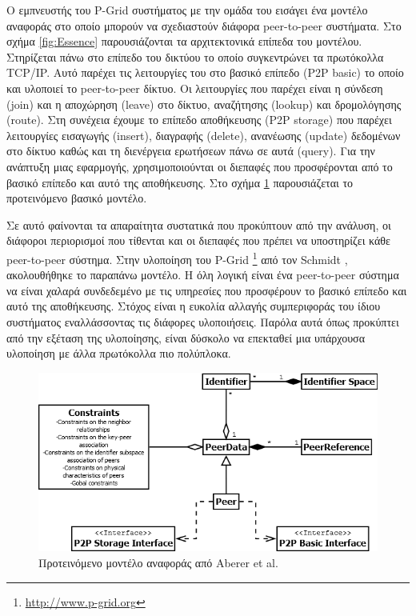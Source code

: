 Ο εμπνευστής του P-Grid συστήματος με την ομάδα του εισάγει ένα 
μοντέλο αναφοράς \citep{Aberer05theessence} στο οποίο μπορούν να σχεδιαστούν 
διάφορα peer-to-peer συστήματα. Στο σχήμα \ref{fig:Essence} παρουσιάζονται τα 
αρχιτεκτονικά επίπεδα του μοντέλου. Στηρίζεται πάνω στο επίπεδο του 
δικτύου το οποίο συγκεντρώνει τα πρωτόκολλα 
TCP/IP. Αυτό παρέχει τις λειτουργίες του στο βασικό επίπεδο (P2P basic) το οποίο και υλοποιεί το 
peer-to-peer δίκτυο. Οι λειτουργίες που παρέχει είναι η σύνδεση (join) 
και η αποχώρηση (leave) στο δίκτυο, αναζήτησης (lookup) και δρομολόγησης 
(route). 
Στη συνέχεια έχουμε το επίπεδο αποθήκευσης (P2P storage) που 
παρέχει λειτουργίες εισαγωγής (insert), διαγραφής (delete), ανανέωσης 
(update) δεδομένων στο δίκτυο καθώς και τη διενέργεια ερωτήσεων πάνω σε 
αυτά (query). Για την ανάπτυξη μιας εφαρμογής, χρησιμοποιούνται οι 
διεπαφές που προσφέρονται από το βασικό επίπεδο και αυτό της 
αποθήκευσης. Στο σχήμα \ref{fig:Essence_UML} παρουσιάζεται το 
προτεινόμενο βασικό μοντέλο.

Σε αυτό φαίνονται τα απαραίτητα συστατικά που προκύπτουν από την 
ανάλυση, οι διάφοροι περιορισμοί που τίθενται και οι διεπαφές που πρέπει 
να υποστηρίζει κάθε peer-to-peer σύστημα. Στην υλοποίηση του P-Grid 
\footnote{\url{http://www.p-grid.org}}
από τον Schmidt \citep{Schmidt2007}, ακολουθήθηκε το παραπάνω 
μοντέλο. Η όλη λογική είναι ένα peer-to-peer σύστημα να είναι χαλαρά 
συνδεδεμένο με τις υπηρεσίες που προσφέρουν το βασικό επίπεδο και αυτό 
της αποθήκευσης. Στόχος είναι η ευκολία αλλαγής συμπεριφοράς του ίδιου 
συστήματος εναλλάσσοντας τις διάφορες υλοποιήσεις. Παρόλα αυτά όπως 
προκύπτει από την εξέταση της υλοποίησης, είναι δύσκολο να επεκταθεί μια 
υπάρχουσα υλοποίηση με άλλα πρωτόκολλα πιο πολύπλοκα.

\begin{figure}[htpb]
  \begin{center}
    \includegraphics[scale=0.55]{Figures/Related_work/The_essence_of_p2p_(uml).png}
  \end{center}
  \caption{Προτεινόμενο μοντέλο αναφοράς από Aberer et al.}
  \label{fig:Essence_UML}
\end{figure}

